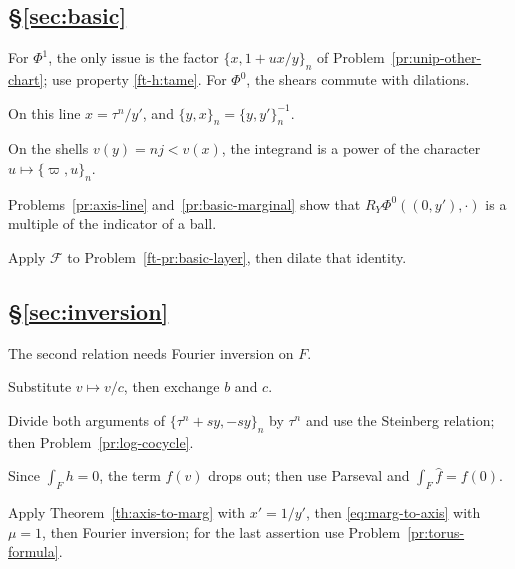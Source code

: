 \documentclass[reqno]{amsart}
\newcommand{\Fc}{\mathcal{F}}
\numberwithin{equation}{section}
\theoremstyle{definition}
\theoremstyle{plain}
\newenvironment{hints}{\begin{description}[font=\normalfont\bfseries]}{\end{description}}
\begin{document}
\subsection*{\S\ref{sec:basic}}
\begin{hints}
\item[\ref{pr:basic-invariant}] For $\Phi^1$, the only issue is the factor $\{x, 1 + u x / y\}_n$ of Problem~\ref{pr:unip-other-chart}; use property \ref{ft-h:tame}.  For $\Phi^0$, the shears commute with dilations.
\item[\ref{pr:axis-line}] On this line $x = \tau^n / y'$, and $\{y, x\}_n = \{y, y'\}_n^{-1}$.
\item[\ref{pr:basic-marginal}] On the shells $v(y) = n j < v(x)$, the integrand is a power of the character $u \mapsto \{\varpi, u\}_n$.
\item[\ref{pr:basic-axis-values}] Problems~\ref{pr:axis-line} and~\ref{pr:basic-marginal} show that $R_Y \Phi^0((0, y'), \cdot)$ is a multiple of the indicator of a ball.
\item[\ref{pr:basic-in-S}] Apply $\Fc$ to Problem~\ref{ft-pr:basic-layer}, then dilate that identity.
\end{hints}

\subsection*{\S\ref{sec:inversion}}
\begin{hints}
\item[\ref{pr:lin-marginals}] The second relation needs Fourier inversion on $F$.
\item[\ref{pr:log-cocycle}] Substitute $v \mapsto v / c$, then exchange $b$ and $c$.
\item[\ref{pr:steinberg-line}] Divide both arguments of $\{\tau^n + s y, - s y\}_n$ by $\tau^n$ and use the Steinberg relation; then Problem~\ref{pr:log-cocycle}.
\item[\ref{pr:linear-factor}] Since $\int_F h = 0$, the term $f(v)$ drops out; then use Parseval and $\int_F \hat{f} = f(0)$.
\item[\ref{pr:inversion-axis}] Apply Theorem~\ref{th:axis-to-marg} with $x' = 1/y'$, then \eqref{eq:marg-to-axis} with $\mu = 1$, then Fourier inversion; for the last assertion use Problem~\ref{pr:torus-formula}.
\end{hints}
\end{document}
